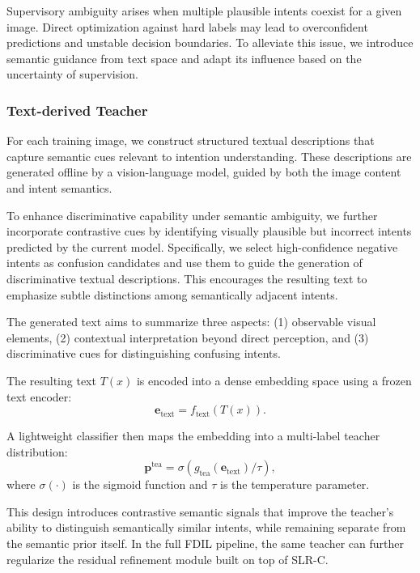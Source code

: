 Supervisory ambiguity arises when multiple plausible intents coexist for a given image. Direct optimization against hard labels may lead to overconfident predictions and unstable decision boundaries. To alleviate this issue, we introduce semantic guidance from text space and adapt its influence based on the uncertainty of supervision.

\subsubsection{Text-derived Teacher}

For each training image, we construct structured textual descriptions that capture semantic cues relevant to intention understanding. These descriptions are generated offline by a vision-language model, guided by both the image content and intent semantics.

To enhance discriminative capability under semantic ambiguity, we further incorporate contrastive cues by identifying visually plausible but incorrect intents predicted by the current model. Specifically, we select high-confidence negative intents as confusion candidates and use them to guide the generation of discriminative textual descriptions. This encourages the resulting text to emphasize subtle distinctions among semantically adjacent intents.

The generated text aims to summarize three aspects:
(1) observable visual elements,
(2) contextual interpretation beyond direct perception, and
(3) discriminative cues for distinguishing confusing intents.

The resulting text $T(x)$ is encoded into a dense embedding space using a frozen text encoder:
\begin{equation}
\mathbf{e}_{\text{text}} = f_{\text{text}}(T(x)).
\end{equation}

A lightweight classifier then maps the embedding into a multi-label teacher distribution:
\begin{equation}
\mathbf{p}^{\text{tea}} = \sigma(g_{\text{tea}}(\mathbf{e}_{\text{text}}) / \tau),
\end{equation}
where $\sigma(\cdot)$ is the sigmoid function and $\tau$ is the temperature parameter.

This design introduces contrastive semantic signals that improve the teacher's ability to distinguish semantically similar intents, while remaining separate from the semantic prior itself. In the full FDIL pipeline, the same teacher can further regularize the residual refinement module built on top of SLR-C.

